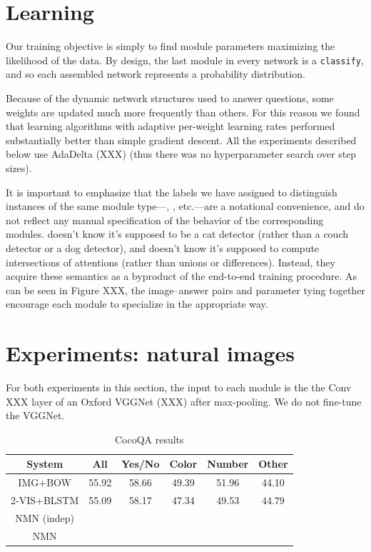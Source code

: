 \documentclass[10pt,twocolumn,letterpaper]{article}
\begin{document}
\section{Learning}

Our training objective is simply to find module parameters maximizing the
likelihood of the data. By design, the last module in every network is a
{\small\tt classify}, and so each assembled network represents a probability
distribution.

Because of the dynamic network structures used to answer questions, some weights
are updated much more frequently than others. For this reason we found that
learning algorithms with adaptive per-weight learning rates performed
substantially better than simple gradient descent. All the experiments described
below use AdaDelta (XXX) (thus there was no hyperparameter search over step sizes).

It is important to emphasize that the labels we have assigned to distinguish
instances of the same module type---, , etc.---are a
notational convenience, and do not reflect any manual specification of the
behavior of the corresponding modules.  doesn't know it's
supposed to be a cat detector (rather than a couch detector or a dog detector),
and  doesn't know it's supposed to compute intersections of
attentions (rather than unions or differences). Instead, they acquire these
semantics as a byproduct of the end-to-end training procedure. As can be seen in
Figure XXX, the image--answer pairs and parameter tying together encourage each
module to specialize in the appropriate way.


\section{Experiments: natural images}

For both experiments in this section, the input to each  module is
the the Conv XXX layer of an Oxford VGGNet (XXX) after max-pooling. We do not
fine-tune the VGGNet.

\begin{table}
  \footnotesize
  \center
  \begin{tabular}{cccccc}
    \toprule
    System & All & Yes/No & Color & Number & Other \\
    \midrule
    IMG+BOW & 55.92 & 58.66 & 49.39 & 51.96 & 44.10 \\
    2-VIS+BLSTM & 55.09 & 58.17 & 47.34 & 49.53 & 44.79 \\
    NMN (indep) \\
    NMN \\
    \bottomrule
  \end{tabular}
  \caption{CocoQA results}
\end{table}
\end{document}
